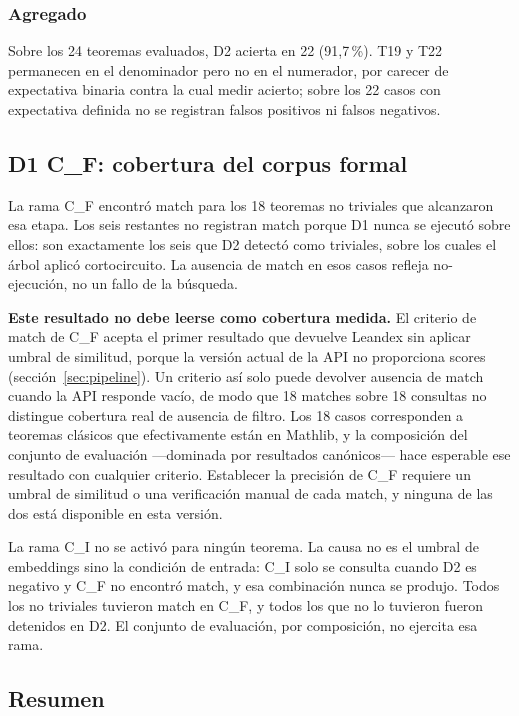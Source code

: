 \documentclass[12pt,a4paper]{article}
\theoremstyle{remark}
\begin{document}
\subsubsection*{Agregado}

Sobre los 24 teoremas evaluados, D2 acierta en 22 (91{,}7\,\%). T19 y T22 permanecen en el denominador pero no en el numerador, por carecer de expectativa binaria contra la cual medir acierto; sobre los 22 casos con expectativa definida no se registran falsos positivos ni falsos negativos.

\subsection{D1 C\_F: cobertura del corpus formal}

La rama C\_F encontró match para los 18 teoremas no triviales que alcanzaron esa etapa. Los seis restantes no registran match porque D1 nunca se ejecutó sobre ellos: son exactamente los seis que D2 detectó como triviales, sobre los cuales el árbol aplicó cortocircuito. La ausencia de match en esos casos refleja no-ejecución, no un fallo de la búsqueda.

\textbf{Este resultado no debe leerse como cobertura medida.} El criterio de match de C\_F acepta el primer resultado que devuelve Leandex sin aplicar umbral de similitud, porque la versión actual de la API no proporciona scores (sección~\ref{sec:pipeline}). Un criterio así solo puede devolver ausencia de match cuando la API responde vacío, de modo que 18 matches sobre 18 consultas no distingue cobertura real de ausencia de filtro. Los 18 casos corresponden a teoremas clásicos que efectivamente están en Mathlib, y la composición del conjunto de evaluación —dominada por resultados canónicos— hace esperable ese resultado con cualquier criterio. Establecer la precisión de C\_F requiere un umbral de similitud o una verificación manual de cada match, y ninguna de las dos está disponible en esta versión.

La rama C\_I no se activó para ningún teorema. La causa no es el umbral de embeddings sino la condición de entrada: C\_I solo se consulta cuando D2 es negativo y C\_F no encontró match, y esa combinación nunca se produjo. Todos los no triviales tuvieron match en C\_F, y todos los que no lo tuvieron fueron detenidos en D2. El conjunto de evaluación, por composición, no ejercita esa rama.

\subsection{Resumen}
\end{document}
